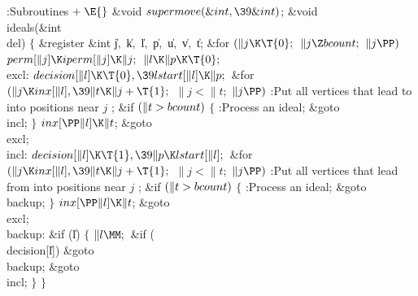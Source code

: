 \Y\B\4:Subroutines\X${}\mathrel+\E{}$\6
\&{void} ${}\\{supermove}(\&{int},\39\&{int}){}$;\7
\&{void} \\{ideals}(\&{int} \\{del})\1\1\2\2\6
${}\{{}$\1\6
\&{register} \&{int} \|j${},{}$ \|k${},{}$ \|l${},{}$ \|p${},{}$ \|u${},{}$ %
\|v${},{}$ \|t;\7
\&{for} ${}(\|j\K\T{0};{}$ ${}\|j\Z\\{bcount};{}$ ${}\|j\PP){}$\1\5
${}\\{perm}[\|j]\K\\{iperm}[\|j]\K\|j;{}$\2\6
${}\|l\K\|p\K\T{0};{}$\6
\4\\{excl}:\5
${}\\{decision}[\|l]\K\T{0},\39\\{lstart}[\|l]\K\|p;{}$\6
\&{for} ${}(\|j\K\\{inx}[\|l],\39\|t\K\|j+\T{1};{}$ ${}\|j<\|t;{}$ ${}\|j%
\PP){}$\1\5
:Put all vertices that lead to  into positions near $j$%
\X;\2\6
\&{if} ${}(\|t>\\{bcount}){}$\5
${}\{{}$\1\6
:Process an ideal\X;\5
\&{goto} \\{incl};\6
\4${}\}{}$\2\6
${}\\{inx}[\PP\|l]\K\|t{}$;\5
\&{goto} \\{excl};\6
\4\\{incl}:\5
${}\\{decision}[\|l]\K\T{1},\39\|p\K\\{lstart}[\|l];{}$\6
\&{for} ${}(\|j\K\\{inx}[\|l],\39\|t\K\|j+\T{1};{}$ ${}\|j<\|t;{}$ ${}\|j%
\PP){}$\1\5
:Put all vertices that lead from  into positions near $j$%
\X;\2\6
\&{if} ${}(\|t>\\{bcount}){}$\5
${}\{{}$\1\6
:Process an ideal\X;\5
\&{goto} \\{backup};\6
\4${}\}{}$\2\6
${}\\{inx}[\PP\|l]\K\|t{}$;\5
\&{goto} \\{excl};\6
\4\\{backup}:\5
\&{if} (\|l)\5
${}\{{}$\1\6
${}\|l\MM;{}$\6
\&{if} (\\{decision}[\|l])\1\5
\&{goto} \\{backup};\2\6
\&{goto} \\{incl};\6
\4${}\}{}$\2\6
\4${}\}{}$\2\par
\fi

